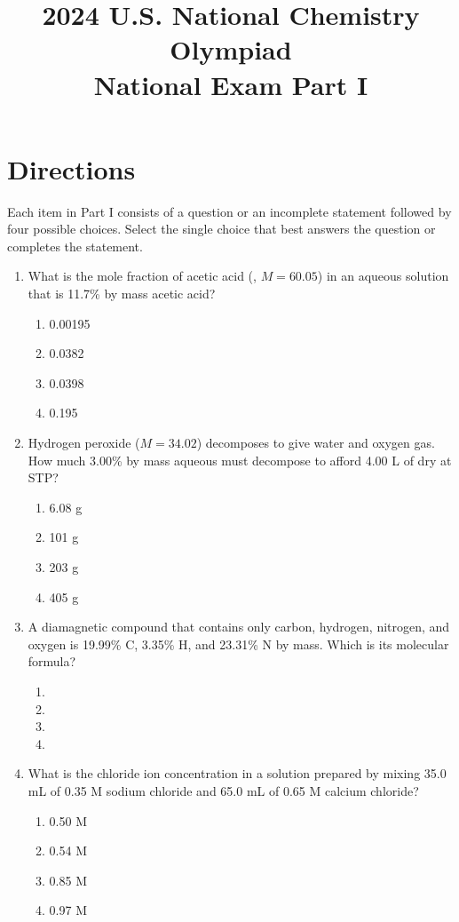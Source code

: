 \documentclass[twocolumn, 10pt]{article}
\title{2024 U.S. National Chemistry Olympiad\\National Exam Part I}
\date{}
\author{}
\begin{document}
\maketitle

\section*{Directions}
Each item in Part I consists of a question or an incomplete statement followed by four possible choices. Select the single choice that best answers the question or completes the statement.

\begin{enumerate}

    \item What is the mole fraction of acetic acid (, $M = 60.05$) in an aqueous solution that is 11.7\% by mass acetic acid?
    \begin{enumerate}
        \item 0.00195
        \item 0.0382
        \item 0.0398
        \item 0.195
    \end{enumerate}

    \item Hydrogen peroxide ($M = 34.02$) decomposes to give water and oxygen gas. How much 3.00\% by mass aqueous  must decompose to afford 4.00 L of dry  at STP?
    \begin{enumerate}
        \item 6.08 g
        \item 101 g
        \item 203 g
        \item 405 g
    \end{enumerate}

    \item A diamagnetic compound that contains only carbon, hydrogen, nitrogen, and oxygen is 19.99\% C, 3.35\% H, and 23.31\% N by mass. Which is its molecular formula?
    \begin{enumerate}
        \item {}
        \item {}
        \item {}
        \item {}
    \end{enumerate}

    \item What is the chloride ion concentration in a solution prepared by mixing 35.0 mL of 0.35 M sodium chloride and 65.0 mL of 0.65 M calcium chloride?
    \begin{enumerate}
        \item 0.50 M
        \item 0.54 M
        \item 0.85 M
        \item 0.97 M
    \end{enumerate}


\end{enumerate}
\end{document}
